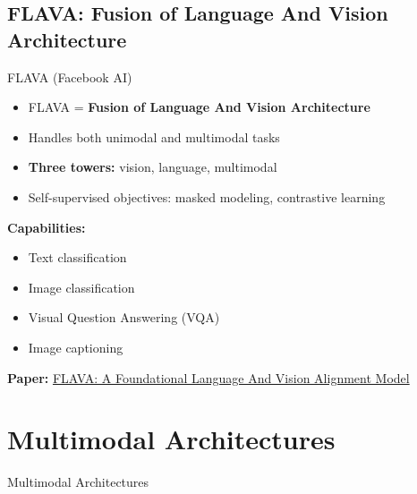 \subsection{FLAVA: Fusion of Language And Vision Architecture}
\begin{frame}[allowframebreaks]{FLAVA (Facebook AI)}
    \begin{itemize}
        \item FLAVA = \textbf{Fusion of Language And Vision Architecture}
        \item Handles both unimodal and multimodal tasks
        \item \textbf{Three towers:} vision, language, multimodal
        \item Self-supervised objectives: masked modeling, contrastive learning
    \end{itemize}
    \vspace{0.5em}
    \textbf{Capabilities:}
    \begin{itemize}
        \item Text classification
        \item Image classification
        \item Visual Question Answering (VQA)
        \item Image captioning
    \end{itemize}
    \vspace{0.5em}
    \textbf{Paper:} \href{https://arxiv.org/abs/2112.04482}{FLAVA: A Foundational Language And Vision Alignment Model}
\end{frame}


\section{Multimodal Architectures}
\begin{frame}{}
    \LARGE Multimodal Architectures
\end{frame}


